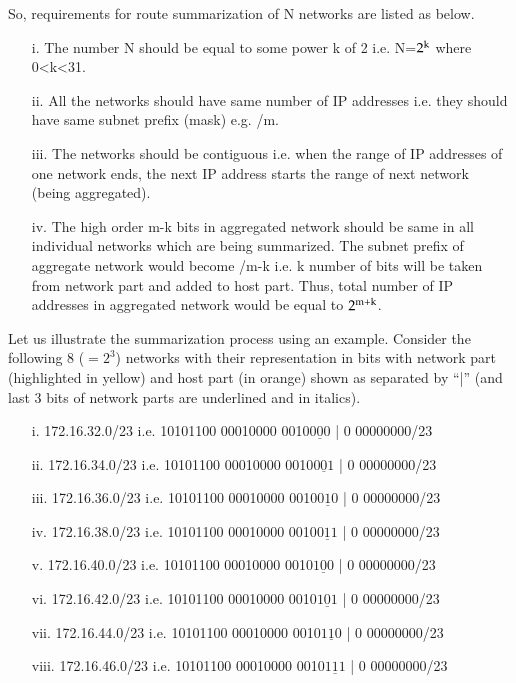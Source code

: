 \begin{multicols}{2}
So, requirements for route summarization of N networks are listed as below. 
\begin{itemize}
\item[i.] The number N should be equal to some power k of 2 i.e. N=$2^{\rm k}$ where 0<k<31.
\item[ii.] All the networks should have same number of IP addresses i.e. they should have same subnet prefix (mask) e.g. /m.
\item[iii.] The networks should be contiguous i.e. when the range of IP addresses of one network ends, the next IP address starts the range of next network (being aggregated).
\item[iv.] The high order m-k bits in aggregated network should be same in all individual networks which are being summarized. The subnet prefix of aggregate network would become /m-k i.e. k number of bits will be taken from network part and added to host part. Thus, total number of IP addresses in aggregated network would be equal to $2^{\rm m+k}$.
\end{itemize}

Let us illustrate the summarization process using an example. Consider the following 8 ($=2^{3}$) networks with their representation in bits with network part (highlighted in yellow) and host part (in orange) shown as separated by “|” (and last 3 bits of network parts are underlined and in italics).

\begin{itemize}
\item[i.] 172.16.32.0/23 i.e. 10101100 00010000 0010$\underline{\textit{000}}$ | 0 00000000/23
\item[ii.] 172.16.34.0/23 i.e. 10101100 00010000 0010$\underline{\textit{001}}$ | 0 00000000/23
\item[iii.] 172.16.36.0/23 i.e. 10101100 00010000 0010$\underline{\textit{010}}$ | 0 00000000/23
\item[iv.] 172.16.38.0/23 i.e. 10101100 00010000 0010$\underline{\textit{011}}$ | 0 00000000/23
\item[v.] 172.16.40.0/23 i.e. 10101100 00010000 0010$\underline{\textit{100}}$ | 0 00000000/23
\item[vi.] 172.16.42.0/23 i.e. 10101100 00010000 0010$\underline{\textit{101}}$ | 0 00000000/23
\item[vii.] 172.16.44.0/23 i.e. 10101100 00010000 0010$\underline{\textit{110}}$ | 0 00000000/23
\item[viii.] 172.16.46.0/23 i.e. 10101100 00010000 0010$\underline{\textit{111}}$ | 0 00000000/23
\end{itemize}


\end{multicols}
